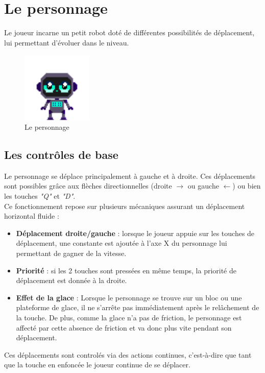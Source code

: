 \documentclass[10pt]{report}
\begin{document}
\section{Le personnage}
Le joueur incarne un petit robot doté de différentes possibilités de déplacement, lui permettant d'évoluer dans le niveau.


\begin{figure}[H]
  \centering
  \includegraphics[width=0.3\textwidth]{images/character_placeholder}
  \caption{Le personnage}
\end{figure}

\subsection{Les contrôles de base}
Le personnage se déplace principalement à gauche et à droite. Ces déplacements sont possibles grâce aux flèches directionnelles (droite $\rightarrow$ ou gauche $\leftarrow$) ou bien les touches \emph{"Q"} et \emph{"D"}.\\
Ce fonctionnement repose sur plusieurs mécaniques assurant un déplacement horizontal fluide :

\begin{itemize}
  \item \textbf{Déplacement droite/gauche} : lorsque le joueur appuie sur les touches de déplacement, une constante est ajoutée à l'axe X du personnage lui permettant de gagner de la vitesse.
  \item \textbf{Priorité} : si les 2 touches sont pressées en même temps, la priorité de déplacement est donnée à la droite.
  \item \textbf{Effet de la glace} : Lorsque le personnage se trouve sur un bloc ou une plateforme de glace, il ne s'arrête pas immédiatement après le relâchement de la touche. De plus, comme la glace n'a pas de friction, le personnage est affecté par cette absence de friction et va donc plus vite pendant son déplacement.
\end{itemize}

Ces déplacements sont controlés via des actions continues, c'est-à-dire que tant que la touche en enfoncée le joueur continue de se déplacer. 
\end{document}
